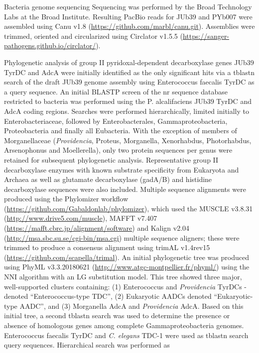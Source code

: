\documentclass[]{article}
\begin{document}
Bacteria genome sequencing Sequencing was performed by the Broad
Technology Labs at the Broad Institute. Resulting PacBio reads for JUb39
and PYb007 were assembled using Canu v1.8
(\url{https://github.com/marbl/canu.git}). Assemblies were trimmed,
oriented and circularized using Circlator v1.5.5
(\url{https://sanger-pathogens.github.io/circlator/}).

Phylogenetic analysis of group II pyridoxal-dependent decarboxylase
genes JUb39 TyrDC and AdcA were initially identified as the only
significant hits via a tblastn search of the draft JUb39 genome assembly
using Enterococcus faecalis TyrDC as a query sequence. An initial BLASTP
screen of the nr sequence database restricted to bacteria was performed
using the P. alcalifaciens JUb39 TyrDC and AdcA coding regions. Searches
were performed hierarchically, limited initially to Enterobacteriaceae,
followed by Enterobacterales, Gammaproteobacteria, Proteobacteria and
finally all Eubacteria. With the exception of members of Morganellaceae
(\textit{Providencia}, Proteus, Morganella, Xenorhabdus, Photorhabdus,
Arsenophonus and Moellerella), only two protein sequences per genus were
retained for subsequent phylogenetic analysis. Representative group II
decarboxylase enzymes with known substrate specificity from Eukaryota
and Archaea as well as glutamate decarboxylase (gadA/B) and histidine
decarboxylase sequences were also included. Multiple sequence alignments
were produced using the Phylomizer workflow
(\url{https://github.com/Gabaldonlab/phylomizer}), which used the MUSCLE
v3.8.31 (\url{http://www.drive5.com/muscle}), MAFFT v7.407
(\url{https://mafft.cbrc.jp/alignment/software}) and Kalign v2.04
(\url{http://msa.sbc.su.se/cgi-bin/msa.cgi}) multiple sequence aligners;
these were trimmed to produce a consensus alignment using trimAL
v1.4rev15 (\url{https://github.com/scapella/trimal}). An initial
phylogenetic tree was produced using PhyML v3.3.20180621
(\url{http://www.atgc-montpellier.fr/phyml/}) using the NNI algorithm
with an LG substitution model. This tree showed three major,
well-supported clusters containing: (1) Enterococcus and
\textit{Providencia} TyrDCs - denoted ``Enterococcus-type TDC'', (2)
Eukaryotic AADCs denoted ``Eukaryotic-type AADC'', and (3) Morganella
AdcA and \textit{Providencia} AdcA. Based on this initial tree, a second
tblastn search was used to determine the presence or absence of
homologous genes among complete Gammaproteobacteria genomes.
Enterococcus faecalis TyrDC and \textit{C. elegans} TDC-1 were used as
tblastn search query sequences. Hierarchical search was performed as
\end{document}
